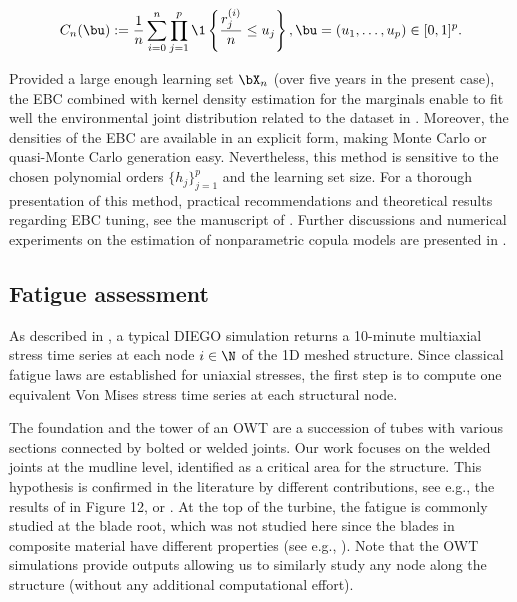 \begin{equation}
    C_n(\bu) := \frac1n \sum_{i=0}^{n} \prod_{j=1}^{p} \1 \left\{ \frac{r_j^{(i)}}{n} \leq u_j \right\}, \bu = (u_1, \dots, u_p) \in [0, 1]^p.
\end{equation}

Provided a large enough learning set $\bX_n$ (over five years in the present case), the EBC combined with kernel density estimation for the marginals enable to fit well the environmental joint distribution related to the dataset in . 
Moreover, the densities of the EBC are available in an explicit form, making Monte Carlo or quasi-Monte Carlo generation easy. 
Nevertheless, this method is sensitive to the chosen polynomial orders $\{h_j\}_{j=1}^p$ and the learning set size. 
For a thorough presentation of this method, practical recommendations and theoretical results regarding EBC tuning, see the manuscript of \cite{lasserre_2022}. 
Further discussions and numerical experiments on the estimation of nonparametric copula models are presented in \cite{nagler_2017}. 


\subsection{Fatigue assessment}
As described in , a typical DIEGO simulation returns a 10-minute multiaxial stress time series at each node $i \in \N$ of the 1D meshed structure. 
Since classical fatigue laws are established for uniaxial stresses, the first step is to compute one equivalent Von Mises stress time series at each structural node.

The foundation and the tower of an OWT are a succession of tubes with various sections connected by bolted or welded joints. 
Our work focuses on the welded joints at the mudline level, identified as a critical area for the structure. This hypothesis is confirmed in the literature by different contributions, see e.g., the results of \citet{muller_cheng_2018} in Figure 12, or \citet{katsikogiannis_2021_owt_fatigue}. 
At the top of the turbine, the fatigue is commonly studied at the blade root, which was not studied here since the blades in composite material have different properties (see e.g., \cite{dimitrov_2013}). 
Note that the OWT simulations provide outputs allowing us to similarly study any node along the structure (without any additional computational effort).

